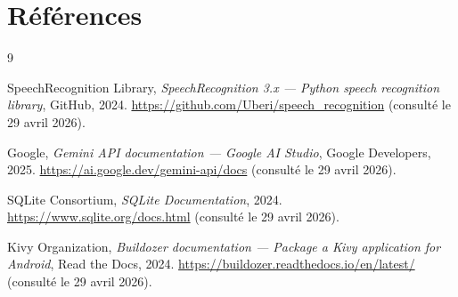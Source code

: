 \documentclass[a4paper,10pt]{article}
\begin{document}
\section{Références}

\begin{thebibliography}{9}

SpeechRecognition Library,
\textit{SpeechRecognition 3.x --- Python speech recognition library},
GitHub, 2024.
\url{https://github.com/Uberi/speech_recognition}
(consulté le 29 avril 2026).

Google,
\textit{Gemini API documentation --- Google AI Studio},
Google Developers, 2025.
\url{https://ai.google.dev/gemini-api/docs}
(consulté le 29 avril 2026).

SQLite Consortium,
\textit{SQLite Documentation},
2024.
\url{https://www.sqlite.org/docs.html}
(consulté le 29 avril 2026).

Kivy Organization,
\textit{Buildozer documentation --- Package a Kivy application for Android},
Read the Docs, 2024.
\url{https://buildozer.readthedocs.io/en/latest/}
(consulté le 29 avril 2026).

\end{thebibliography}
\end{document}
